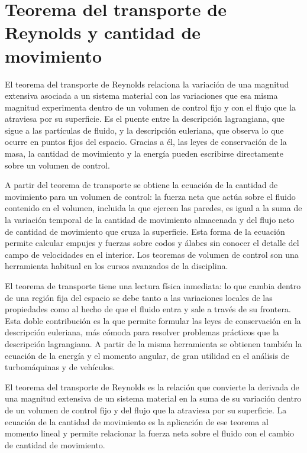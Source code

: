 \documentclass{book}
\begin{document}
\chapter{Teorema del transporte de Reynolds y cantidad de movimiento}

El teorema del transporte de Reynolds relaciona la variación de una magnitud extensiva asociada a un sistema material con las variaciones que esa misma magnitud experimenta dentro de un volumen de control fijo y con el flujo que la atraviesa por su superficie. Es el puente entre la descripción lagrangiana, que sigue a las partículas de fluido, y la descripción euleriana, que observa lo que ocurre en puntos fijos del espacio. Gracias a él, las leyes de conservación de la masa, la cantidad de movimiento y la energía pueden escribirse directamente sobre un volumen de control.

A partir del teorema de transporte se obtiene la ecuación de la cantidad de movimiento para un volumen de control: la fuerza neta que actúa sobre el fluido contenido en el volumen, incluida la que ejercen las paredes, es igual a la suma de la variación temporal de la cantidad de movimiento almacenada y del flujo neto de cantidad de movimiento que cruza la superficie. Esta forma de la ecuación permite calcular empujes y fuerzas sobre codos y álabes sin conocer el detalle del campo de velocidades en el interior. Los teoremas de volumen de control son una herramienta habitual en los cursos avanzados de la disciplina.

El teorema de transporte tiene una lectura física inmediata: lo que cambia dentro de una región fija del espacio se debe tanto a las variaciones locales de las propiedades como al hecho de que el fluido entra y sale a través de su frontera. Esta doble contribución es la que permite formular las leyes de conservación en la descripción euleriana, más cómoda para resolver problemas prácticos que la descripción lagrangiana. A partir de la misma herramienta se obtienen también la ecuación de la energía y el momento angular, de gran utilidad en el análisis de turbomáquinas y de vehículos.

\begin{tcolorbox}[title={Definición}, studiumdef, breakable]

El teorema del transporte de Reynolds es la relación que convierte la derivada de una magnitud extensiva de un sistema material en la suma de su variación dentro de un volumen de control fijo y del flujo que la atraviesa por su superficie. La ecuación de la cantidad de movimiento es la aplicación de ese teorema al momento lineal y permite relacionar la fuerza neta sobre el fluido con el cambio de cantidad de movimiento.
\end{tcolorbox}
\end{document}
